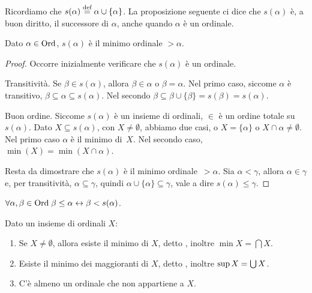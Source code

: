 Ricordiamo che $s(\alpha) \overset{\text{def}}{=} \alpha \cup \{\alpha\}$. La proposizione seguente ci dice che $s(\alpha)$ \`e, a buon diritto, il successore di $\alpha$, anche quando $\alpha$
\`e un ordinale.

\begin{proposition}
	Dato $\alpha \in \operatorname{Ord}$, $s(\alpha)$ \`e il minimo ordinale $> \alpha$.
\end{proposition}

\begin{proof}
	Occorre inizialmente verificare che $s(\alpha)$ \`e un ordinale.

{\drkblu Transitivit\`a.} Se $\beta \in s(\alpha)$, allora $\beta \in
\alpha$ o $\beta = \alpha$. Nel primo caso, siccome $\alpha$ \`e
transitivo, $\beta\subseteq\alpha\subseteq s(\alpha)$. Nel secondo
$\beta \subseteq \beta \cup \{\beta\} = s(\beta)=s(\alpha)$.

{\drkblu Buon ordine.} Siccome $s(\alpha)$ \`e un insieme di ordinali,
$\in$ \`e un ordine totale su $s(\alpha)$. Dato $X \subseteq s(\alpha)$, con $X \ne \emptyset$,
		abbiamo due casi, o $X = \{\alpha\}$ o $X \cap \alpha \ne
\emptyset$. Nel primo caso $\alpha$ \`e il minimo di~$X$. Nel secondo
caso, $\min(X) = \min(X \cap \alpha)$.

{\drkblu Resta da dimostrare} che $s(\alpha)$ \`e il minimo
ordinale~$>\alpha$. Sia $\alpha < \gamma$, allora $\alpha\in\gamma$ e, per
transitivit\`a, $\alpha\subseteq\gamma$, quindi
$\alpha\cup\{\alpha\}\subseteq\gamma$, vale a dire $s(\alpha)\le\gamma$.
\end{proof}

\begin{corollary}
	$\forall {\alpha,\beta \in\operatorname{Ord}} \; \beta \leq \alpha \leftrightarrow \beta < s(\alpha)$.
\end{corollary}

\begin{proposition}
	Dato un insieme di ordinali $X$:
	\begin{enumerate}[1.]
		\item Se $X \ne \emptyset$, allora esiste il minimo di $X$, detto , inoltre $\min X = \bigcap X$.
		\item Esiste il minimo dei maggioranti di $X$, detto
, inoltre $\sup X = {\textstyle\bigcup}\, X$.
		\item C'\`e almeno un ordinale che non appartiene a $X$.
	\end{enumerate}
\end{proposition}

